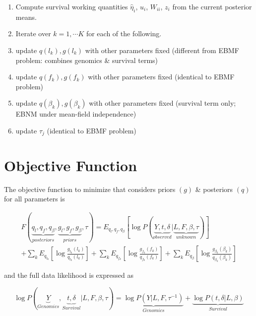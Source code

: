 \documentclass{article}[12pt]
\begin{document}
\begin{enumerate}
    \item Compute survival working quantities $\hat{\eta}_i$, $u_i$, $W_{ii}$, $z_i$
          from the current posterior means.

    \item Iterate over $k=1, \cdots K$ for each of the following.

    \item update $q(l_k), g(l_k)$ with other parameters fixed (different from EBMF problem: combines genomics \& survival terms)

    \item update $q(f_k), g(f_k)$ with other parameters fixed (identical to EBMF problem)

    \item update $q(\beta_k), g(\beta_k)$ with other parameters fixed (survival term only; EBNM under mean-field independence)

    \item update $\tau_{j}$ (identical to EBMF problem)
\end{enumerate}
\section{Objective Function}

The objective function to minimize that considers priors $(g)$ \& posteriors $(q)$ for all parameters is

\begin{multline}
    F\left(\underbrace{q_{l}, q_{f}, q_{\beta}}_{posteriors}, \underbrace{g_{l}, g_{f}, g_{\beta}}_{priors}, \tau\right) = E_{q_{l}, q_{f}, q_{\beta}}\left[\log P\left(\underbrace{Y, t, \delta}_{observed} \vert \underbrace{L, F, \beta, \tau}_{unknown}\right)\right]\\
    + \sum_{k}E_{q_{l_k}}\left[\log \frac{g_{l_k}(l_k)}{q_{l_k}(l_k)}\right] + \sum_{k}E_{q_{f_k}}\left[\log \frac{g_{f_k}(f_k)}{q_{f_k}(f_k)}\right] + \sum_{k}E_{q_{\beta}}\left[\log \frac{g_{\beta_k}(\beta_k)}{q_{\beta_k}(\beta_k)}\right]
\end{multline}

and the full data likelihood is expressed as

\begin{equation}
    \log P\left(\underbrace{Y}_{Genomics}, \underbrace{t, \delta}_{Survival} \vert L, F, \beta, \tau\right) = \underbrace{\log P\left(Y \vert L, F, \tau^{-1}\right)}_{Genomics} + \underbrace{\log P\left(t, \delta \vert L, \beta\right)}_{Survival}
\end{equation}
\end{document}
